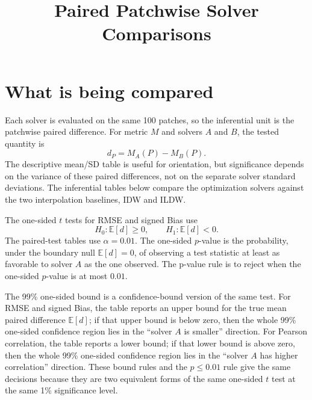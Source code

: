 \documentclass[11pt]{article}
\title{Paired Patchwise Solver Comparisons}
\author{}
\date{}
\begin{document}
\maketitle

\section*{What is being compared}
Each solver is evaluated on the same 100 patches, so the inferential unit is the patchwise paired difference. For metric $M$ and solvers $A$ and $B$, the tested quantity is
\[
d_P = M_A(P) - M_B(P).
\]
The descriptive mean/SD table is useful for orientation, but significance depends on the variance of these paired differences, not on the separate solver standard deviations. The inferential tables below compare the optimization solvers against the two interpolation baselines, IDW and ILDW.

The one-sided $t$ tests for RMSE and signed Bias use
\[
H_0:\mathbb{E}[d]\ge 0,\qquad H_1:\mathbb{E}[d]<0.
\]
The paired-test tables use $\alpha=0.01$. The one-sided $p$-value is the probability, under the boundary null $\mathbb{E}[d]=0$, of observing a test statistic at least as favorable to solver $A$ as the one observed. The p-value rule is to reject when the one-sided $p$-value is at most $0.01$.

The 99\% one-sided bound is a confidence-bound version of the same test. For RMSE and signed Bias, the table reports an upper bound for the true mean paired difference $\mathbb{E}[d]$; if that upper bound is below zero, then the whole 99\% one-sided confidence region lies in the ``solver $A$ is smaller'' direction. For Pearson correlation, the table reports a lower bound; if that lower bound is above zero, then the whole 99\% one-sided confidence region lies in the ``solver $A$ has higher correlation'' direction. These bound rules and the $p \le 0.01$ rule give the same decisions because they are two equivalent forms of the same one-sided $t$ test at the same 1\% significance level.
\end{document}
